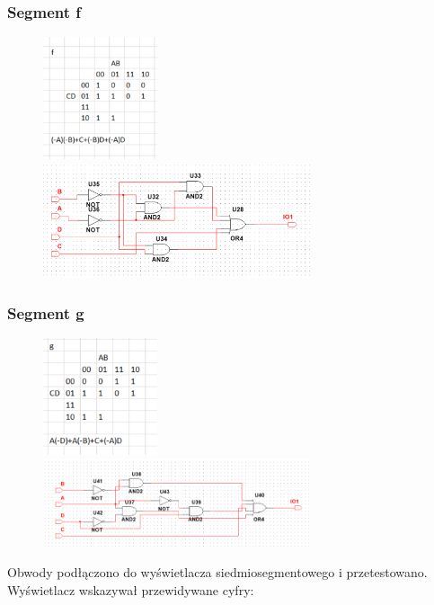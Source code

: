 \documentclass[12pt,a4paper]{article}
\begin{document}
\newpage
\subsubsection{Segment f}
\begin{figure}[H]
\centering
\includegraphics[width=0.3\textwidth]{7seg/seg5}
\includegraphics[width=0.7\textwidth]{7seg/seg5circ}
\end{figure}

\subsubsection{Segment g}
\begin{figure}[H]
\centering
\includegraphics[width=0.3\textwidth]{7seg/seg6}
\includegraphics[width=0.7\textwidth]{7seg/seg6circ}
\end{figure}

\newpage
Obwody podłączono do wyświetlacza siedmiosegmentowego i przetestowano. Wyświetlacz wskazywał przewidywane cyfry:
\end{document}
